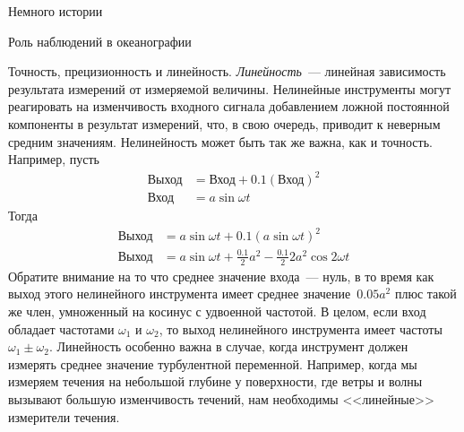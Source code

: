 \begin{chapter}{Немного истории}
\begin{section}{Роль наблюдений в океанографии}
\begin{paragraph}{Точность, прецизионность и линейность.}
\emph{Линейность}~--- линейная зависимость результата измерений от измеряемой
величины. Нелинейные инструменты могут реагировать на изменчивость входного
сигнала добавлением ложной постоянной компоненты в результат измерений, что,
в свою очередь, приводит к неверным средним значениям. Нелинейность может 
быть так же важна, как и точность. Например, пусть
\begin{align*}
\mbox{Выход} & = \mbox{Вход} + 0.1 (\mbox{Вход})^2 \\
\mbox{Вход}  & = a \sin \omega t
\end{align*}
Тогда
\begin{align*}
\mbox{Выход} & = a \sin \omega t + 0.1 (a \sin \omega t)^2 \\
\mbox{Выход} & = a \sin \omega t + \frac{0.1}{2} a^2 - \frac{0.1}{2}2 a^2 \cos 2\omega t
\end{align*}
Обратите внимание на то что среднее значение входа~--- нуль, в то
время как выход этого нелинейного инструмента имеет среднее значение~$0.05a^2$ 
плюс такой же член, умноженный на косинус с удвоенной
частотой. В целом, если вход обладает частотами $\omega_1$ и $\omega_2$, 
то выход нелинейного инструмента имеет частоты $\omega_1\pm \omega_2$. 
Линейность особенно важна в случае, когда инструмент должен измерять 
среднее значение турбулентной переменной. Например, когда мы измеряем течения 
на небольшой глубине у поверхности, где ветры и волны вызывают большую 
изменчивость течений, нам необходимы <<линейные>> измерители течения.
%
\end{paragraph}


\end{section}
\end{chapter}
